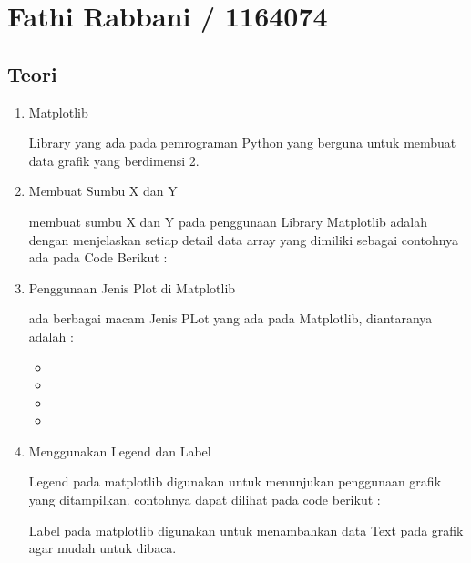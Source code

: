 
\section{Fathi Rabbani / 1164074}
\subsection{Teori}
\begin{enumerate}
\item Matplotlib
\par Library yang ada pada pemrograman Python yang berguna untuk membuat data grafik yang berdimensi 2.

\item Membuat Sumbu X dan Y
\par membuat sumbu X dan Y pada penggunaan Library Matplotlib adalah dengan menjelaskan setiap detail data array yang dimiliki sebagai contohnya ada pada Code Berikut : 


\item Penggunaan Jenis Plot di Matplotlib
\par ada berbagai macam Jenis PLot yang ada pada Matplotlib, diantaranya adalah :
\begin{itemize}
\item 
\item 
\item 
\item 
\end{itemize}

\item Menggunakan Legend dan Label
\par Legend pada matplotlib digunakan untuk menunjukan penggunaan grafik yang ditampilkan. contohnya dapat dilihat pada code berikut : 


\par Label pada matplotlib digunakan untuk menambahkan data Text pada grafik agar mudah untuk dibaca.



\end{enumerate}

